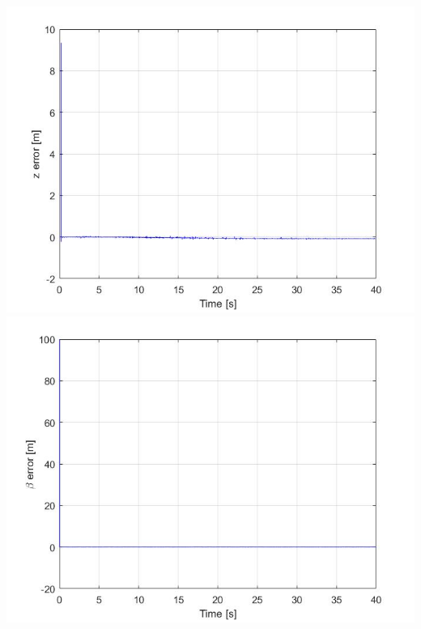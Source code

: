 \documentclass{beamer}
\begin{document}
\begin{frame}
\begin{columns}[t]
			\includegraphics[scale=0.18]{nlo_z_0}\\
			\includegraphics[scale=0.18]{nlo_beta_0}
		\end{columns}
	\end{frame}
\end{document}
